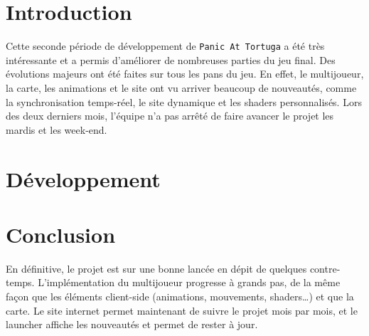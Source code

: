 \documentclass[french, 15pt]{article}
\begin{document}


\tableofcontents
\newpage

\pagestyle{fancy}

\section{Introduction}

Cette seconde période de développement de \texttt{Panic At Tortuga}
a été très intéressante et a permis d'améliorer de nombreuses parties du jeu final. 
Des évolutions majeurs ont été faites sur tous les pans du jeu. En effet, le multijoueur, 
la carte, les animations et le site ont vu arriver beaucoup de nouveautés, comme la 
synchronisation temps-réel, le site dynamique et les shaders personnalisés. Lors des deux derniers 
mois, l'équipe n'a pas arrêté de faire avancer le projet les mardis et les week-end.

\newpage
\section{Développement}










\newpage
\section{Conclusion}
En définitive, le projet est sur une bonne lancée en dépit de quelques contre-temps.
L’implémentation du multijoueur progresse à grands pas, de la même façon que les éléments
client-side (animations, mouvements, shaders…) et que la carte. Le site internet permet
maintenant de suivre le projet mois par mois, et le launcher affiche les nouveautés et permet de rester à jour.
\listoffigures
\listoftables
\end{document}
